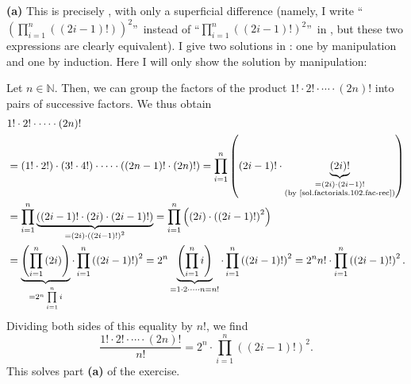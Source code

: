 \documentclass[paper=a4, fontsize=12pt]{scrartcl}%
\let\prodnonlimits\prod
\renewcommand{\prod}{\prodnonlimits\limits}
\theoremstyle{plainsl}
\theoremstyle{definition}
\theoremstyle{remark}
\begin{document}
\vspace{0.809pc}

\textbf{(a)} This is precisely \cite[Exercise 3.5 \textbf{(c)}]{detnotes},
with only a superficial difference (namely, I write \textquotedblleft$\left(
\prod_{i=1}^{n}\left(  \left(  2i-1\right)  !\right)  \right)  ^{2}%
$\textquotedblright\ instead of \textquotedblleft$\prod_{i=1}^{n}\left(
\left(  2i-1\right)  !\right)  ^{2}$\textquotedblright\ in \cite[Exercise 3.5
\textbf{(c)}]{detnotes}, but these two expressions are clearly equivalent). I
give two solutions in \cite[solution to Exercise 3.5 \textbf{(c)}]{detnotes}:
one by manipulation and one by induction. Here I will only show the solution
by manipulation:

Let $n\in\mathbb{N}$. Then, we can group the factors of the product
$1!\cdot2!\cdot\cdots\cdot\left(  2n\right)  !$ into pairs of successive
factors. We thus obtain%
\begin{align*}
&  1!\cdot2!\cdot\cdots\cdot\left(  2n\right)  !\\
&  =\left(  1!\cdot2!\right)  \cdot\left(  3!\cdot4!\right)  \cdot\cdots
\cdot\left(  \left(  2n-1\right)  !\cdot\left(  2n\right)  !\right)
=\prod_{i=1}^{n}\left(  \left(  2i-1\right)  !\cdot\underbrace{\left(
2i\right)  !}_{\substack{=\left(  2i\right)  \cdot\left(  2i-1\right)
!\\\text{(by \eqref{sol.factorials.102.fac-rec})}}}\right) \\
&  =\prod_{i=1}^{n}\underbrace{\left(  \left(  2i-1\right)  !\cdot\left(
2i\right)  \cdot\left(  2i-1\right)  !\right)  }_{=\left(  2i\right)
\cdot\left(  \left(  2i-1\right)  !\right)  ^{2}}=\prod_{i=1}^{n}\left(
\left(  2i\right)  \cdot\left(  \left(  2i-1\right)  !\right)  ^{2}\right) \\
&  =\underbrace{\left(  \prod_{i=1}^{n}\left(  2i\right)  \right)  }%
_{=2^{n}\prod_{i=1}^{n}i}\cdot\prod_{i=1}^{n}\left(  \left(  2i-1\right)
!\right)  ^{2}=2^{n}\underbrace{\left(  \prod_{i=1}^{n}i\right)  }%
_{=1\cdot2\cdot\cdots\cdot n=n!}\cdot\prod_{i=1}^{n}\left(  \left(
2i-1\right)  !\right)  ^{2}=2^{n}n!\cdot\prod_{i=1}^{n}\left(  \left(
2i-1\right)  !\right)  ^{2}.
\end{align*}
Dividing both sides of this equality by $n!$, we find%
\[
\dfrac{1!\cdot2!\cdot\cdots\cdot\left(  2n\right)  !}{n!}=2^{n}\cdot
\prod_{i=1}^{n}\left(  \left(  2i-1\right)  !\right)  ^{2}.
\]
This solves part \textbf{(a)} of the exercise.

\vspace{0.806pc}
\end{document}
